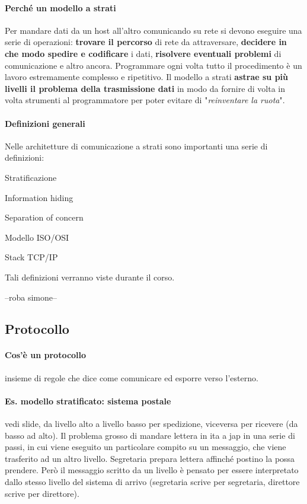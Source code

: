 \documentclass[10pt]{article}
\begin{document}
\paragraph{Perché un modello a strati} Per mandare dati da un host all'altro comunicando su rete si devono eseguire una serie di operazioni: \textbf{trovare il percorso} di rete da attraversare, \textbf{decidere in che modo spedire e codificare} i dati, \textbf{risolvere eventuali problemi} di comunicazione e altro ancora. Programmare ogni volta tutto il procedimento è un lavoro estremamente complesso e ripetitivo. Il modello a strati \textbf{astrae su più livelli il problema della trasmissione dati} in modo da fornire di volta in volta strumenti al programmatore per poter evitare di "\textit{reinventare la ruota}".
\paragraph{Definizioni generali} Nelle architetture di comunicazione a strati sono importanti una serie di definizioni:
\begin{list}{-}{}
\item Stratificazione
\item Information hiding
\item Separation of concern
\item Modello ISO/OSI
\item Stack TCP/IP
\end{list}
Tali definizioni verranno viste durante il corso.

--roba simone--

\subsection{Protocollo}
\paragraph{Cos'è un protocollo} insieme di regole che dice come comunicare ed esporre verso l'esterno.
\paragraph{Es. modello stratificato: sistema postale} vedi slide, da livello alto a livello basso per spedizione, viceversa per ricevere (da basso ad alto). Il problema grosso di mandare lettera in ita a jap in una serie di passi, in cui viene eseguito un particolare compito su un messaggio, che viene trasferito ad un altro livello. Segretaria prepara lettera affinché postino la possa prendere. Però il messaggio scritto da un livello è pensato per essere interpretato dallo stesso livello del sistema di arrivo (segretaria scrive per segretaria, direttore scrive per direttore).
\end{document}
